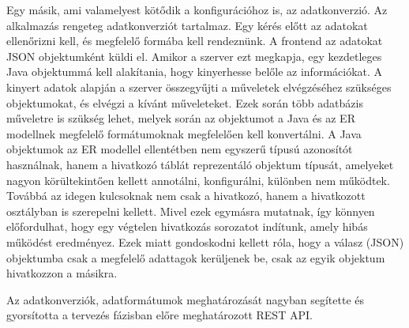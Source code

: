 Egy másik, ami valamelyest kötődik a konfigurációhoz is, az adatkonverzió. Az alkalmazás rengeteg adatkonverziót tartalmaz. Egy kérés előtt az adatokat ellenőrizni kell, és megfelelő formába kell rendeznünk. A frontend az adatokat JSON objektumként küldi el. Amikor a szerver ezt megkapja, egy kezdetleges Java objektummá kell alakítania, hogy kinyerhesse belőle az információkat. A kinyert adatok alapján a szerver összegyűjti a műveletek elvégzéséhez szükséges objektumokat, és elvégzi a kívánt műveleteket. Ezek során több adatbázis műveletre is szükség lehet, melyek során az objektumot a Java és az ER modellnek megfelelő formátumoknak megfelelően kell konvertálni. A Java objektumok az ER modellel ellentétben nem egyszerű típusú azonosítót használnak, hanem a hivatkozó táblát reprezentáló objektum típusát, amelyeket nagyon körültekintően kellett annotálni, konfigurálni, különben nem működtek. Továbbá az idegen kulcsoknak nem csak a hivatkozó, hanem a hivatkozott osztályban is szerepelni kellett. Mivel ezek egymásra mutatnak, így könnyen előfordulhat, hogy egy végtelen hivatkozás sorozatot indítunk, amely hibás működést eredményez. Ezek miatt gondoskodni kellett róla, hogy a válasz (JSON) objektumba csak a megfelelő adattagok kerüljenek be, csak az egyik objektum hivatkozzon a másikra.

Az adatkonverziók, adatformátumok meghatározását nagyban segítette és gyorsította a tervezés fázisban előre meghatározott REST API.
























